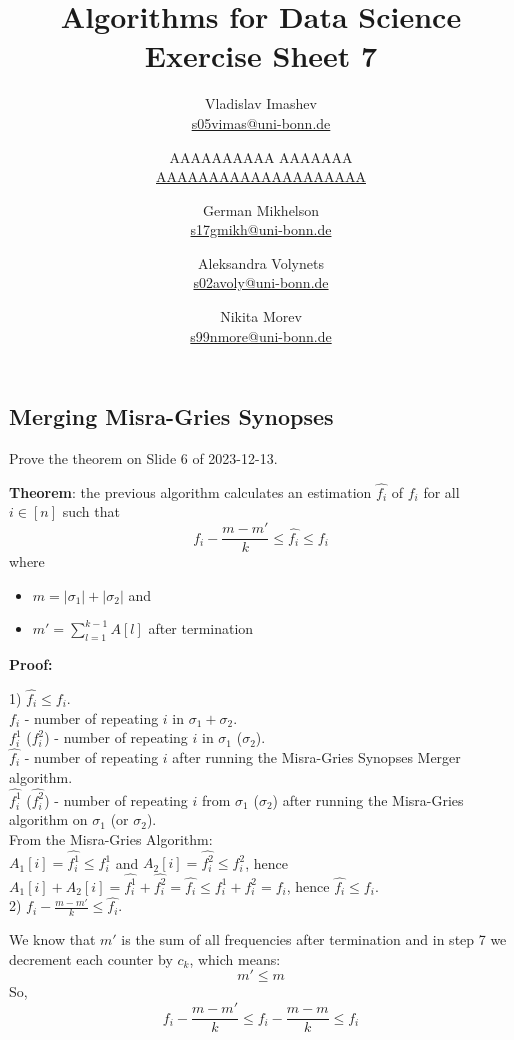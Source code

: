 \documentclass{article}
\title{Algorithms for Data Science \\ Exercise Sheet 7}
\author{
  Vladislav Imashev \\ \href{mailto:s05vimas@uni-bonn.de}{s05vimas@uni-bonn.de} \and
  AAAAAAAAAA AAAAAAA \\ \href{mailto:AAAAAAAAAAAAAAAAAAAA}{AAAAAAAAAAAAAAAAAAAA} \and
  German Mikhelson \\ \href{mailto:s17gmikh@uni-bonn.de}{s17gmikh@uni-bonn.de} \and
  Aleksandra Volynets \\ \href{mailto:s02avoly@uni-bonn.de}{s02avoly@uni-bonn.de} \and
  Nikita Morev \\ \href{mailto:s99nmore@uni-bonn.de}{s99nmore@uni-bonn.de}
}
\begin{document}
  \maketitle

  \setcounter{section}{7}
  \subsection{Merging Misra-Gries Synopses}
  \begin{centerframebox}
    Prove the theorem on Slide 6 of 2023-12-13.

    \textbf{Theorem}: the previous algorithm calculates an estimation $\hat{f_i}$ of $f_i$ for all $i \in [n]$ such that
    \[ f_i - \frac{m-m'}{k} \leq \hat{f_i} \leq f_i \]
    where
    \begin{itemize}
      \item $m = |\sigma_1| + |\sigma_2|$ and
      \item $m' = \sum_{l=1}^{k-1} A[l]$ after termination
    \end{itemize}
  \end{centerframebox}

  \textbf{Proof:}

  1) $\hat{f_i} \leq f_i$. \\
  $f_i$ - number of repeating $i$ in $\sigma_1 + \sigma_2$. \\
  $f^1_i$ ($f^2_i$) - number of repeating $i$ in $\sigma_1$ ($\sigma_2$). \\
  $\hat{f_i}$ - number of repeating $i$ after running the Misra-Gries Synopses Merger algorithm. \\
  $\hat{f^1_i}$ ($\hat{f^2_i}$) - number of repeating $i$ from $\sigma_1$ ($\sigma_2$) after running the Misra-Gries algorithm on $\sigma_1$ (or $\sigma_2$). \\

  From the Misra-Gries Algorithm: \\
  $A_1[i] = \hat{f^1_i} \leq f^1_i$ and $A_2[i] = \hat{f^2_i} \leq f^2_i$, hence $A_1[i] + A_2[i] = \hat{f^1_i} + \hat{f^2_i} = \hat{f_i} \leq f^1_i + f^2_i = f_i$, hence $\hat{f_i} \leq f_i$. \\

  2) $f_i - \frac{m-m'}{k} \leq \hat{f_i}$.

  We know that $m'$ is the sum of all frequencies after termination and in step 7 we decrement each counter by $c_k$, which means:
  \[m' \leq m\]
  So,
  \[f_i - \frac{m-m'}{k} \leq f_i - \frac{m-m}{k} \leq f_i\]
\end{document}
